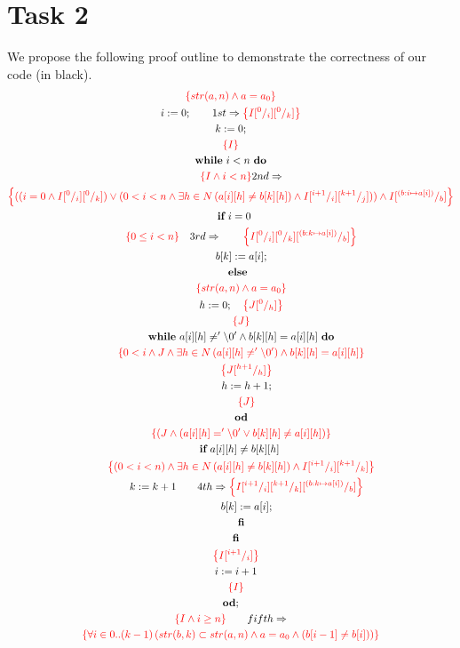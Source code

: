\documentclass[a4paper,12pt,fleqn]{scrartcl}
\newcommand{\assn}[1]{{\color{red}\left\{#1\right\}}}
\begin{document}
\section{Task 2}
\label{sec:task-2}
We propose the following proof outline to demonstrate the correctness
of our code (in black).
\begin{gather*}
	\assn{{str(a,n)\And a}=a_0}\\
	i\Ass 0;\qquad 1st\Implies\assn{I\subst 0i\subst 0k}\\
	k\Ass 0;\\
	\assn{I}\\
	\WHILE~i<n~\DO\\ \qquad\assn{I\And i<n} 2nd \Implies\\
	\assn {((i=0 \AND I\subst0i\subst0k) \OR (0<i<n \AND \Exi{h\in N}{a[i][h] \neq b[k][h]}\AND I\subst{i+1}i\subst{k+1}j))\AND I\subst{(b:i\mapsto a[i])}b}\\
	\quad \IF ~i=0~\\
	\qquad \assn{0\leq i<n}\quad 3rd \Implies	\qquad \assn{I\subst0i\subst0k\subst{(b:k\mapsto a[i])}b }\\
	\qquad b[k]\Ass a[i];\\\
	\quad \ELSE\\
	\qquad\assn{{str(a,n)\And a}=a_0}\\
	\qquad h \Ass 0;\quad\assn {J\subst0h}\\
	\qquad\assn{J}\\
	\qquad \WHILE ~ a[i][h] \neq '\setminus0' \AND b[k][h] = a[i][h]~ \DO\\
	\qquad \assn{0<i \AND J \AND \Exi{h\in N} {a[i][h] \neq '\setminus0'} \AND b[k][h] = a[i][h] }\\
	\qquad\quad \assn{J{\subst {h+1}h}}\\
\qquad\quad h \Ass h+1;\\
\qquad\quad \assn{J}\\
\qquad \OD\\
\qquad\assn {(J \AND (a[i][h] = '\setminus0' \OR b[k][h] \neq a[i][h])}\\
\qquad \IF ~ a[i][h] \neq b[k][h]~ \\
\qquad \assn{(0<i<n) \AND \Exi{h\in N}{a[i][h] \neq b[k][h]}\AND I \subst{i+1}i\subst{k+1}k}\\
\qquad\quad k\Ass k+1 \qquad 4th \Implies\assn{I \subst{i+1}i\subst{k+1}k \subst{(b:k\mapsto a[i])}b }\\
\qquad\quad b[k]\Ass a[i];\\
\qquad \FI\\
\quad \FI\\
\quad \assn{I\subst{i+1}i}\\
\quad i\Ass i+1\\
\quad \assn{I}\\
\OD;\\
\assn{I\And i\geq n} \qquad fifth \Implies\\
\assn{\All{i\in 0..(k-1)} {str(b,k) \subset str(a,n) \AND a = a_0 \And (b[i-1] \neq b[i])}}
\end{gather*}
\end{document}
